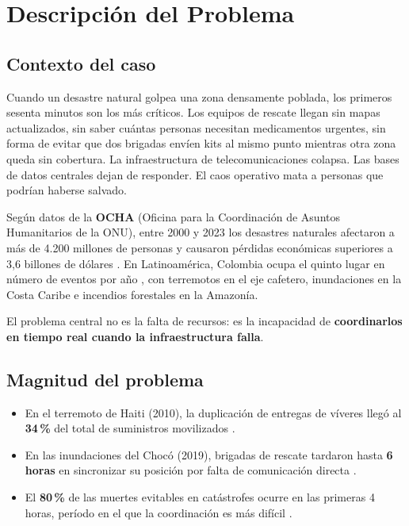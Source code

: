 \documentclass[12pt,a4paper]{article}
\begin{document}
\tableofcontents
\newpage

\section{Descripción del Problema}

\subsection{Contexto del caso}

Cuando un desastre natural golpea una zona densamente poblada, los primeros
sesenta minutos son los más críticos. Los equipos de rescate llegan sin mapas
actualizados, sin saber cuántas personas necesitan medicamentos urgentes, sin
forma de evitar que dos brigadas envíen kits al mismo punto mientras otra zona
queda sin cobertura. La infraestructura de telecomunicaciones colapsa. Las
bases de datos centrales dejan de responder. El caos operativo mata a personas
que podrían haberse salvado.

Según datos de la \textbf{OCHA} (Oficina para la Coordinación de Asuntos
Humanitarios de la ONU), entre 2000 y 2023 los desastres naturales afectaron
a más de 4.200 millones de personas y causaron pérdidas económicas superiores
a 3,6 billones de dólares \cite{ocha2023}. En Latinoamérica, Colombia ocupa
el quinto lugar en número de eventos por año \cite{ungrd2022}, con terremotos
en el eje cafetero, inundaciones en la Costa Caribe e incendios forestales en
la Amazonía.

El problema central no es la falta de recursos: es la incapacidad de
\textbf{coordinarlos en tiempo real cuando la infraestructura falla}.

\subsection{Magnitud del problema}

\begin{itemize}[leftmargin=1.5em]
  \item En el terremoto de Haiti (2010), la duplicación de entregas de víveres
        llegó al \textbf{34\,\%} del total de suministros movilizados
        \cite{schuller2016}.
  \item En las inundaciones del Chocó (2019), brigadas de rescate tardaron
        hasta \textbf{6 horas} en sincronizar su posición por falta de
        comunicación directa \cite{ungrd2022}.
  \item El \textbf{80\,\%} de las muertes evitables en catástrofes ocurre en
        las primeras 4 horas, período en el que la coordinación es más difícil
        \cite{who2022}.
\end{itemize}
\end{document}
